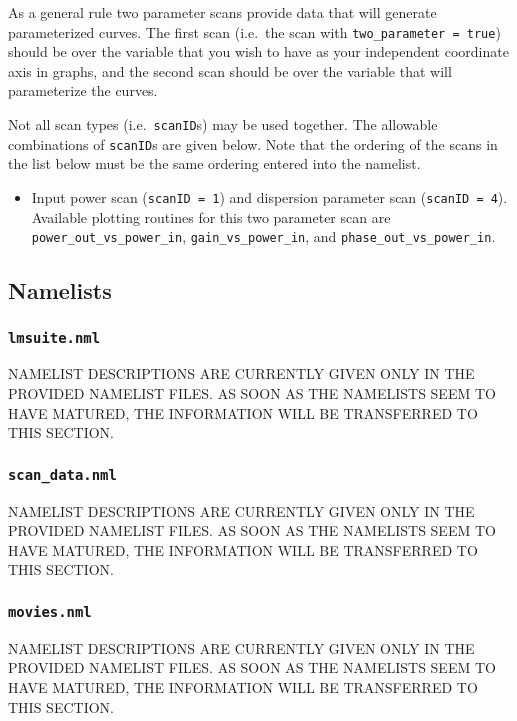 \documentclass{article}
\begin{document}
As a general rule two parameter scans provide data that will generate
parameterized curves. The first scan (i.e.~the scan with
{\tt two\_parameter = true}) should be over the variable that you wish
to have as your independent coordinate axis in graphs, and the second scan
should be
over the variable that will parameterize the curves.

Not all scan types (i.e.~{\tt scanID}s) may be used together.
The allowable combinations of {\tt scanID}s are given below.
Note that the ordering of the scans in the list below must be the same
ordering entered into the namelist.
\begin{itemize}
\item Input power scan ({\tt scanID = 1}) and dispersion parameter scan
  ({\tt scanID = 4}).
  Available plotting routines for this two parameter scan are\\
  {\tt power\_out\_vs\_power\_in}, {\tt gain\_vs\_power\_in}, and
  {\tt phase\_out\_vs\_power\_in}.
\end{itemize}


\subsection{Namelists}\label{sec:namelists}
\subsubsection{\tt lmsuite.nml}
NAMELIST DESCRIPTIONS ARE CURRENTLY GIVEN ONLY IN THE PROVIDED NAMELIST
FILES. AS SOON AS THE NAMELISTS SEEM TO HAVE MATURED, THE INFORMATION WILL
BE TRANSFERRED TO THIS SECTION.

\subsubsection{\tt scan\_data.nml}\label{ss:scan_data}
NAMELIST DESCRIPTIONS ARE CURRENTLY GIVEN ONLY IN THE PROVIDED NAMELIST
FILES. AS SOON AS THE NAMELISTS SEEM TO HAVE MATURED, THE INFORMATION WILL
BE TRANSFERRED TO THIS SECTION.

\subsubsection{\tt movies.nml}\label{ss:movies}
NAMELIST DESCRIPTIONS ARE CURRENTLY GIVEN ONLY IN THE PROVIDED NAMELIST
FILES. AS SOON AS THE NAMELISTS SEEM TO HAVE MATURED, THE INFORMATION WILL
BE TRANSFERRED TO THIS SECTION.
\end{document}
